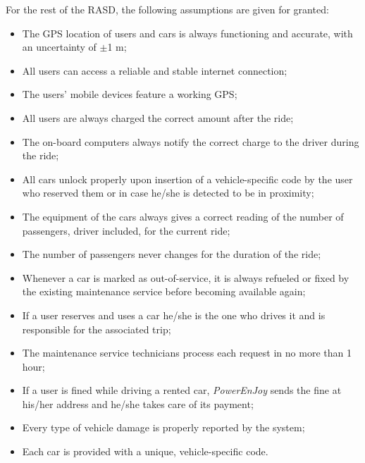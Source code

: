 For the rest of the RASD, the following assumptions are given for granted:

\begin{itemize}
\item The GPS location of users and cars is always functioning and accurate, with an uncertainty of $\pm$1 m; 
\item All users can access a reliable and stable internet connection;
\item The users' mobile devices feature a working GPS;
\item All users are always charged the correct amount after the ride;
\item The on-board computers always notify the correct charge to the driver during the ride;
\item All cars unlock properly upon insertion of a vehicle-specific code by the user who reserved them or in case he/she is detected to be in proximity;
\item The equipment of the cars always gives a correct reading of the number of passengers, driver included, for the current ride;
\item The number of passengers never changes for the duration of the ride;
\item Whenever a car is marked as out-of-service, it is always refueled or fixed by the existing maintenance service before becoming available again;
\item If a user reserves and uses a car he/she is the one who drives it and is responsible for the associated trip;
\item The maintenance service technicians process each request in no more than 1 hour;
\item If a user is fined while driving a rented car, \emph{PowerEnJoy} sends the fine at his/her address and he/she takes care of its payment;
\item Every type of vehicle damage is properly reported by the system;
\item Each car is provided with a unique, vehicle-specific code.
\end{itemize}